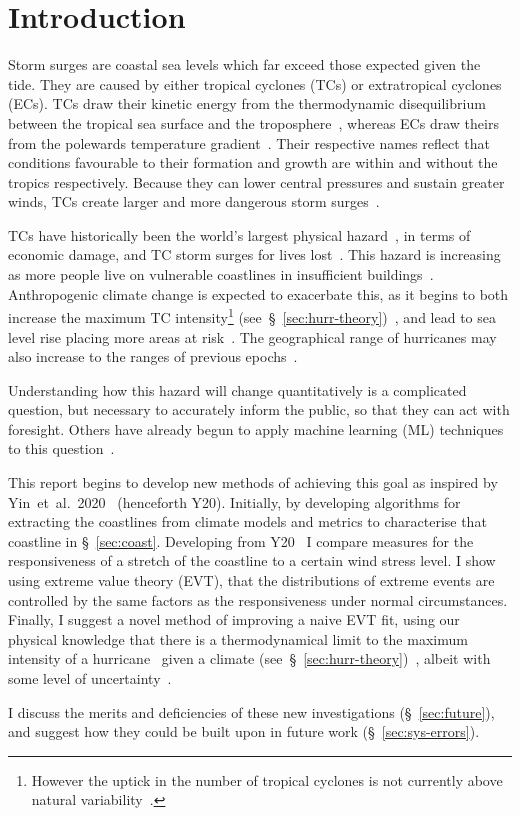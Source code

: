 \section{Introduction}
\label{sec:1_Introduction}


Storm surges are coastal sea levels which far exceed those
expected given the tide.
They are caused by either tropical cyclones
(TCs) or extratropical cyclones (ECs).
TCs draw their kinetic energy from the thermodynamic disequilibrium between
the tropical sea surface and the troposphere~\cite{emanuel1987dependence},
whereas ECs draw theirs from the
polewards temperature gradient~\cite{lorenz1960energy, holton2004introduction}.
Their respective names reflect that conditions favourable
to their formation and growth are within and without the tropics respectively.
Because they can lower central pressures and sustain greater winds,
TCs create larger and more dangerous storm surges~\cite{emanuel2005divine}.

TCs have historically been the
world's largest physical hazard~\cite{shultz2005epidemiology},
in terms of economic damage, and TC storm surges for lives lost~\cite{zhang2009tropical}.
This hazard is increasing as more people live on vulnerable coastlines
in insufficient buildings~\cite{emanuel2005divine}.
Anthropogenic climate change is expected to exacerbate this,
as it begins to both increase the maximum TC intensity\footnote{However the uptick
in the number of tropical cyclones is not currently above
 natural variability~\cite{mendelsohn2012impact}.}
(see~§~\ref{sec:hurr-theory})~\cite{emanuel2008hurricanes,emanuel2017will},
and lead to sea level rise placing more areas at risk~\cite{SROCC}.
The geographical range of hurricanes may also increase
to the ranges of previous epochs~\cite{fedorov2010tropical}.

Understanding how this hazard will change quantitatively
is a complicated question, but necessary to accurately
inform the public,
so that they can act with foresight.
Others have already begun to apply machine learning (ML) techniques to this
question~\cite{kulp2019new, kulp2018coastaldem, tadesse2020data}.




This report begins to develop new methods of achieving this goal
as inspired by Yin~et~al.~2020~\cite{ZannaPreprint} (henceforth Y20). Initially, by
developing algorithms for extracting the coastlines from climate models
and metrics to characterise that coastline in §~\ref{sec:coast}.
Developing from Y20~\cite{ZannaPreprint} I compare measures for the
responsiveness of a stretch of the coastline to a certain wind stress
level. I show using extreme value theory (EVT), that the
distributions of extreme events are controlled by the same factors as
the responsiveness under normal circumstances. Finally, I suggest a
novel method of improving a naive EVT fit, using our physical knowledge
that there is a thermodynamical limit to the maximum intensity of a hurricane~\cite{emanuel1999thermodynamic}
 given a climate (see~§~\ref{sec:hurr-theory})~\cite{emanuel1987dependence}, albeit with some level of
 uncertainty~\cite{emanuel2016predictability}.


I discuss the merits and deficiencies of these new investigations (§~\ref{sec:future}),
and suggest how they could be built upon in future work (§~\ref{sec:sys-errors}).
